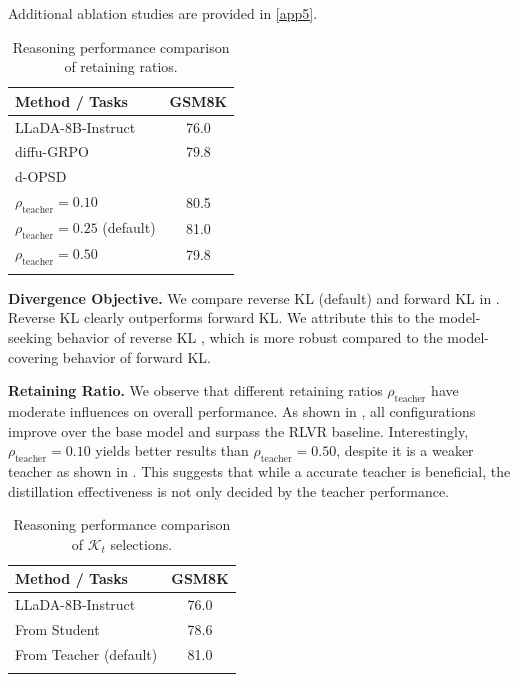 \documentclass{article}
\begin{document}
Additional ablation studies are provided in \cref{app5}.

\begin{table}
\vspace{-25pt}
\setlength{\tabcolsep}{4pt}
\centering
\caption{Reasoning performance comparison of retaining ratios.}
\begin{tabular}{lc}
\toprule
\textbf{Method / Tasks} & \textbf{GSM8K} \\
\midrule
LLaDA-8B-Instruct & 76.0  \\
diffu-GRPO & 79.8 \\
d-OPSD \\
\quad $\rho_\text{teacher}=0.10$ & 80.5 \\
\quad $\rho_\text{teacher}=0.25$ (default) & \cellcolor{lightblue} 81.0 \\
\quad $\rho_\text{teacher}=0.50$ & 79.8 \\
\bottomrule
\label{tab6}
\end{tabular}
\vspace{-25pt}
\end{table}

\textbf{Divergence Objective. } We compare reverse KL (default) and forward KL in . Reverse KL clearly outperforms forward KL. We attribute this to the model-seeking behavior of reverse KL \citep{agarwal2024policy}, which is more robust compared to the model-covering behavior of forward KL.

\textbf{Retaining Ratio. } We observe that different retaining ratios $\rho_\text{teacher}$ have moderate influences on overall performance. As shown in , all configurations improve over the base model and surpass the RLVR baseline. Interestingly, $\rho_\text{teacher}=0.10$ yields better results than $\rho_\text{teacher}=0.50$, despite it is a weaker teacher as shown in . This suggests that while a accurate teacher is beneficial, the distillation effectiveness is not only decided by the teacher performance.

\begin{table}
\vspace{-15pt}
\setlength{\tabcolsep}{4pt}
\centering
\caption{Reasoning performance comparison of $\mathcal{K}_t$ selections.}
\begin{tabular}{lc}
\toprule
\textbf{Method / Tasks} & \textbf{GSM8K} \\
\midrule
LLaDA-8B-Instruct & 76.0 \\
From Student & 78.6 \\
From Teacher (default) & \cellcolor{lightblue} 81.0 \\
\bottomrule
\label{tab7}
\end{tabular}
\vspace{-20pt}
\end{table}
\end{document}
